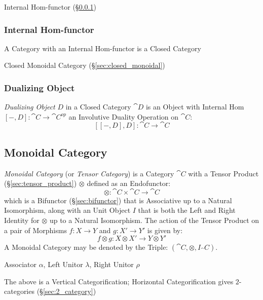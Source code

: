 Internal Hom-functor (\S\ref{sec:internal_homfunctor})



\subsubsection{Internal Hom-functor}\label{sec:internal_homfunctor}

A Category with an Internal Hom-functor is a Closed Category

Closed Monoidal Category (\S\ref{sec:closed_monoidal})



\subsubsection{Dualizing Object}\label{sec:dualizing_object}

\emph{Dualizing Object} $D$ in a Closed Category $\cat{D}$ is an
Object with Internal Hom $[-,D]: \cat{C} \rightarrow \cat{C}^{op}$ an
Involutive Duality Operation on $\cat{C}$: %
\[
  [[-,D],D]: \cat{C} \rightarrow \cat{C}
\]



\subsection{Monoidal Category}\label{sec:monoidal_category}

\emph{Monoidal Category} (or \emph{Tensor Category}) is a Category
$\cat{C}$ with a Tensor Product (\S\ref{sec:tensor_product})
$\otimes$ defined as an Endofunctor:
\[
  \otimes : \cat{C} \times \cat{C} \rightarrow \cat{C}
\]
which is a Bifunctor (\S\ref{sec:bifunctor}) that is Associative up to
a Natural Isomorphism, along with an Unit Object $I$ that is both the
Left and Right Identity for $\otimes$ up to a Natural Isomorphism. The
action of the Tensor Product on a pair of Morphisms $f : X \rightarrow
Y$ and $g : X' \rightarrow Y'$ is given by:
\[
  f \otimes g : X \otimes X' \rightarrow Y \otimes Y'
\]
A Monoidal Category may be denoted by the Triple: $(\cat{C},
\otimes, I_\cat{C})$.

Associator $\alpha$, Left Unitor $\lambda$, Right Unitor $\rho$

The above is a Vertical Categorification; Horizontal Categorification
gives $2$-categories (\S\ref{sec:2_category})

